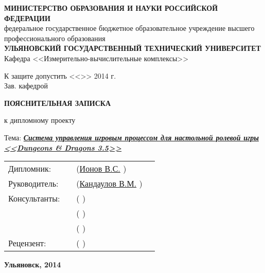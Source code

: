 \begin{titlepage}



\small
\begin{center}

\MakeTextUppercase{\textbf{министерство образования и науки российской федерации}}\\
федеральное государственное бюджетное образовательное учреждение высшего профессионального образования\\
\MakeTextUppercase{\textbf{ульяновский государственный технический университет}}\\[0.7cm]

Кафедра <<Измерительно-вычислительные комплексы>>\\[0.7cm]

\begin{flushright}

К защите допустить <<\underline{\hspace{1cm}}>>\underline{\hspace{2.5cm}} 2014 г.\\
Зав. кафедрой \underline{\hspace{3.5cm}}

\end{flushright}

\vspace{1.5cm}

\LARGE

\textbf{ПОЯСНИТЕЛЬНАЯ ЗАПИСКА}

\Large

к дипломному проекту\\[0.7cm]

\normalsize

Тема: \textbf{\textit{\uline{Система управления игровым процессом для настольной ролевой игры <<Dungeons \& Dragons 3.5>>}}}

\vspace{2cm}

\begin{tabular}{l m{6cm} m{5cm} l}
    Дипломник:    & \uline{\hfill} & (\uline{Ионов В.С.\hfill}     )  & \\[0.5cm]
    Руководитель: & \uline{\hfill} & (\uline{Кандаулов В.М.\hfill} )  & \\[0.5cm]
    Консультанты: & \uline{\hfill} & (\uline{\hfill}               )  & \\[0.5cm]
                  & \uline{\hfill} & (\uline{\hfill}               )  & \\[0.5cm]
                  & \uline{\hfill} & (\uline{\hfill}               )  & \\[0.5cm]
    Рецензент:    & \uline{\hfill} & (\uline{\hfill}               )  & \\
\end{tabular}

\vfill

\textbf{Ульяновск, 2014}

\end{center}

\end{titlepage}

\restoregeometry
